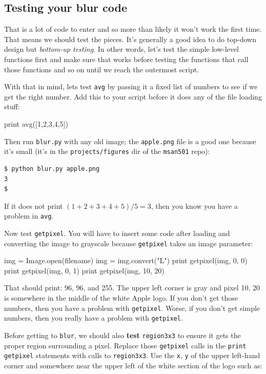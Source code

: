 \documentclass[titlepage]{tufte-book}
\newcounter{problem}
\begin{document}
\subsection{Testing your blur code}

That is a lot of code to enter and so more than likely it won't work the first time. That means we should test the pieces. It's generally a good idea to do top-down design but {\em bottom-up testing}. In other words, let's test the simple low-level functions first and make sure that works before testing the functions that call those functions and so on until we reach the outermost script. 

With that in mind, lets test {\tt avg} by passing it a fixed list of numbers to see if we get the right number. Add this to your script before it does any of the file loading stuff:

\begin{pyverbatim}
print avg([1,2,3,4,5])
\end{pyverbatim}

\noindent Then run {\tt blur.py} with any old image; the {\tt apple.png} file is a good one because it's small (it's in the {\tt projects/figures} dir of the {\tt msan501} repo):

\begin{lstlisting}[style=BashInputStyle]
$ python blur.py apple.png
3
$ 
\end{lstlisting}

\noindent If it does not print $(1+2+3+4+5)/5 = 3$, then you know you have a problem in {\tt avg}.

Now test {\tt getpixel}. You will have to insert some code after loading and converting the image to grayscale because {\tt getpixel} takes an image parameter:

\begin{pyverbatim}
img = Image.open(filename)
img = img.convert("L")
print getpixel(img, 0, 0)
print getpixel(img, 0, 1)
print getpixel(img, 10, 20)
\end{pyverbatim}

\noindent  That should print: 96, 96, and 255. The upper left corner is gray and pixel 10, 20 is somewhere in the middle of the white Apple logo. If you don't get those numbers, then you have a problem with {\tt getpixel}. Worse, if you don't get simple numbers, then you really have a problem with {\tt getpixel}.

Before getting to {\tt blur}, we should also {\bf test} {\tt region3x3} to ensure it gets the proper region surrounding a pixel. Replace those {\tt getpixel} calls in the {\tt print} {\tt getpixel} statements with calls to {\tt region3x3}. Use the {\tt x}, {\tt y} of the upper left-hand corner and somewhere near the upper left of the white section of the logo such as:
\end{document}
